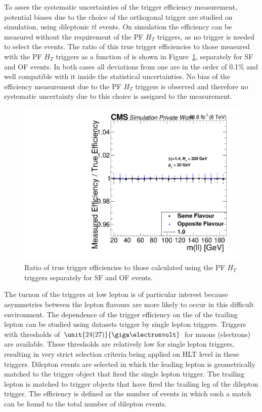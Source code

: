 To asses the systematic uncertainties of the trigger efficiency measurement, potential biases due to the choice of the orthogonal trigger  are studied on simulation, using dileptonic $t\bar{t}$ events. On simulation the efficiency can be measured without the requirement of the PF $H_T$ triggers, as no trigger is needed to select the events. The ratio of this true trigger efficiencies to those measured with the PF $H_T$ triggers as a function of \mll is shown in Figure~\ref{fig:triggerEffBias}, separately for SF and OF events. In both cases all deviations from one are in the order of 0.1\% and well compatible with it inside the statistical uncertainties. No bias of the efficiency measurement due to the PF $H_T$ triggers is observed and therefore no systematic uncertainty due to this choice is assigned to the measurement.
\begin{figure}
\begin{center}
\includegraphics[scale=0.35]{plots/BG/trigger/Triggereff_AlphaTSyst_HT_Barrel_HighHTExclusive_MC_Mll_pt2020.pdf}
\caption{Ratio of true trigger efficiencies to those calculated using the PF $H_T$ triggers separately for SF and OF events.}
\label{fig:triggerEffBias}
\end{center}
\end{figure}
The turnon of the triggers at low lepton \pt is of particular interest because asymmetries between the lepton flavours are more likely to occur in this difficult environment. The dependence of the trigger efficiency on the \pt of the trailing lepton can be studied using datasets trigger by single lepton triggers. Triggers with \pt thresholds of $\unit{24(27)}{\giga\electronvolt}$ for muons (electrons) are available. These thresholds are relatively low for single lepton triggers, resulting in very strict selection criteria being applied on HLT level in these triggers. Dilepton events are selected in which the leading lepton is geometrically matched to the trigger object that fired the single lepton trigger. The trailing lepton is matched to trigger objects that have fired the trailing leg of the dilepton trigger. The efficiency is defined as the number of events in which such a match can be found to the total number of dilepton events.
